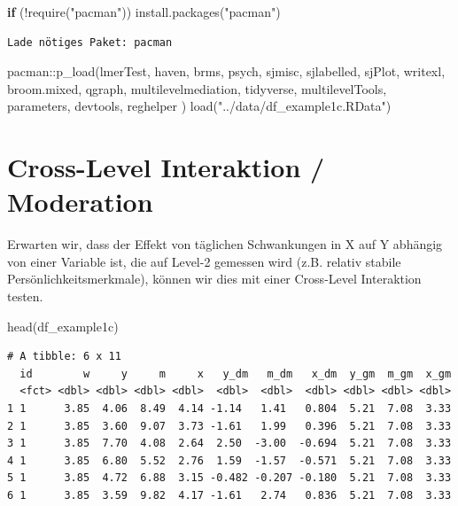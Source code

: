 \documentclass[
  letterpaper,
  DIV=11,
  numbers=noendperiod]{scrreprt}
\newenvironment{Shaded}{\begin{snugshade}}{\end{snugshade}}
\newcommand{\ControlFlowTok}[1]{\textcolor[rgb]{0.00,0.23,0.31}{\textbf{#1}}}
\newcommand{\FunctionTok}[1]{\textcolor[rgb]{0.28,0.35,0.67}{#1}}
\newcommand{\NormalTok}[1]{\textcolor[rgb]{0.00,0.23,0.31}{#1}}
\newcommand{\SpecialCharTok}[1]{\textcolor[rgb]{0.37,0.37,0.37}{#1}}
\newcommand{\StringTok}[1]{\textcolor[rgb]{0.13,0.47,0.30}{#1}}
\begin{document}
\begin{Shaded}
\begin{Highlighting}[]
\ControlFlowTok{if}\NormalTok{ (}\SpecialCharTok{!}\FunctionTok{require}\NormalTok{(}\StringTok{"pacman"}\NormalTok{)) }\FunctionTok{install.packages}\NormalTok{(}\StringTok{"pacman"}\NormalTok{)}
\end{Highlighting}
\end{Shaded}

\begin{verbatim}
Lade nötiges Paket: pacman
\end{verbatim}

\begin{Shaded}
\begin{Highlighting}[]
\NormalTok{pacman}\SpecialCharTok{::}\FunctionTok{p\_load}\NormalTok{(lmerTest, haven, brms, psych,}
\NormalTok{               sjmisc, sjlabelled, sjPlot, writexl, broom.mixed, qgraph,}
\NormalTok{               multilevelmediation,}
\NormalTok{               tidyverse, multilevelTools, parameters, devtools, reghelper}
\NormalTok{               )}
\FunctionTok{load}\NormalTok{(}\StringTok{"../data/df\_example1c.RData"}\NormalTok{)}
\end{Highlighting}
\end{Shaded}

\section{Cross-Level Interaktion /
Moderation}\label{cross-level-interaktion-moderation}

Erwarten wir, dass der Effekt von täglichen Schwankungen in X auf Y
abhängig von einer Variable ist, die auf Level-2 gemessen wird (z.B.
relativ stabile Persönlichkeitsmerkmale), können wir dies mit einer
Cross-Level Interaktion testen.

\begin{Shaded}
\begin{Highlighting}[]
\FunctionTok{head}\NormalTok{(df\_example1c)}
\end{Highlighting}
\end{Shaded}

\begin{verbatim}
# A tibble: 6 x 11
  id        w     y     m     x   y_dm   m_dm   x_dm  y_gm  m_gm  x_gm
  <fct> <dbl> <dbl> <dbl> <dbl>  <dbl>  <dbl>  <dbl> <dbl> <dbl> <dbl>
1 1      3.85  4.06  8.49  4.14 -1.14   1.41   0.804  5.21  7.08  3.33
2 1      3.85  3.60  9.07  3.73 -1.61   1.99   0.396  5.21  7.08  3.33
3 1      3.85  7.70  4.08  2.64  2.50  -3.00  -0.694  5.21  7.08  3.33
4 1      3.85  6.80  5.52  2.76  1.59  -1.57  -0.571  5.21  7.08  3.33
5 1      3.85  4.72  6.88  3.15 -0.482 -0.207 -0.180  5.21  7.08  3.33
6 1      3.85  3.59  9.82  4.17 -1.61   2.74   0.836  5.21  7.08  3.33
\end{verbatim}
\end{document}

